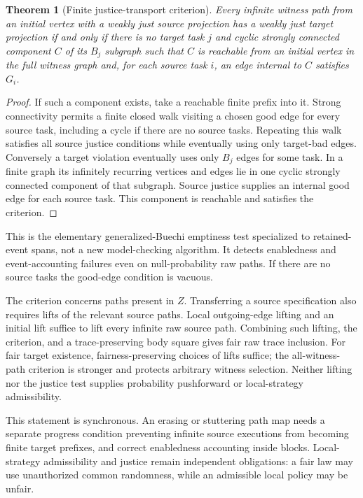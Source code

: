 \documentclass[11pt]{article}
\newtheorem{theorem}{Theorem}\newtheorem{proposition}{Proposition}
\begin{document}
\begin{theorem}[Finite justice-transport criterion]
Every infinite witness path from an initial vertex with a weakly just source projection has a weakly just target projection if and only if there is no target task $j$ and cyclic strongly connected component $C$ of its $B_j$ subgraph such that $C$ is reachable from an initial vertex in the full witness graph and, for each source task $i$, an edge internal to $C$ satisfies $G_i$.
\end{theorem}
\begin{proof}
If such a component exists, take a reachable finite prefix into it. Strong connectivity permits a finite closed walk visiting a chosen good edge for every source task, including a cycle if there are no source tasks. Repeating this walk satisfies all source justice conditions while eventually using only target-bad edges. Conversely a target violation eventually uses only $B_j$ edges for some task. In a finite graph its infinitely recurring vertices and edges lie in one cyclic strongly connected component of that subgraph. Source justice supplies an internal good edge for each source task. This component is reachable and satisfies the criterion.
\end{proof}

This is the elementary generalized-Buechi emptiness test specialized to retained-event spans, not a new model-checking algorithm. It detects enabledness and event-accounting failures even on null-probability raw paths. If there are no source tasks the good-edge condition is vacuous.

The criterion concerns paths present in $Z$. Transferring a source specification also requires lifts of the relevant source paths. Local outgoing-edge lifting and an initial lift suffice to lift every infinite raw source path. Combining such lifting, the criterion, and a trace-preserving body square gives fair raw trace inclusion. For fair target existence, fairness-preserving choices of lifts suffice; the all-witness-path criterion is stronger and protects arbitrary witness selection. Neither lifting nor the justice test supplies probability pushforward or local-strategy admissibility.

This statement is synchronous. An erasing or stuttering path map needs a separate progress condition preventing infinite source executions from becoming finite target prefixes, and correct enabledness accounting inside blocks. Local-strategy admissibility and justice remain independent obligations: a fair law may use unauthorized common randomness, while an admissible local policy may be unfair.
\end{document}

